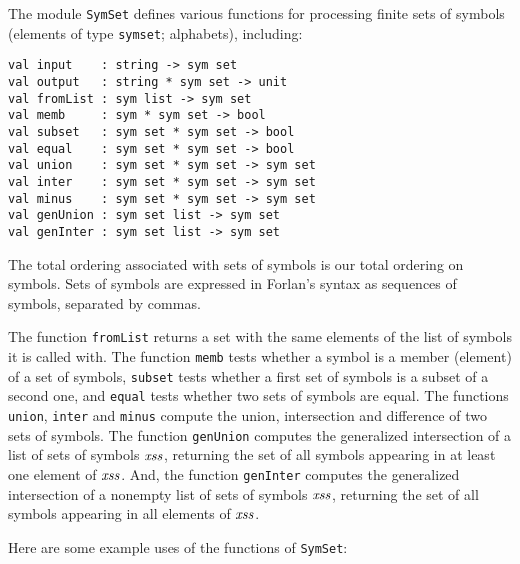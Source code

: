 The module \texttt{SymSet}
%
defines various functions for processing
finite sets of symbols (elements of type \texttt{sym\;set};
%
alphabets), including:
\begin{verbatim}
val input    : string -> sym set
val output   : string * sym set -> unit
val fromList : sym list -> sym set
val memb     : sym * sym set -> bool
val subset   : sym set * sym set -> bool
val equal    : sym set * sym set -> bool
val union    : sym set * sym set -> sym set
val inter    : sym set * sym set -> sym set
val minus    : sym set * sym set -> sym set
val genUnion : sym set list -> sym set
val genInter : sym set list -> sym set
\end{verbatim}
%
%
%
%
%
%
%
%
%
%
%
The total ordering associated with sets of symbols is our total
ordering on symbols.  Sets of symbols are expressed in Forlan's syntax
as sequences of symbols, separated by commas.

The function \texttt{fromList} returns a set with the same elements of
the list of symbols it is called with.  The function \texttt{memb}
tests whether a symbol is a member (element) of a set of symbols,
\texttt{subset} tests whether a first set of symbols is a subset of a
second one, and \texttt{equal} tests whether two sets of symbols are
equal.  The functions \texttt{union}, \texttt{inter} and
\texttt{minus} compute the union, intersection and difference of two
sets of symbols.  The function \texttt{genUnion} computes the
generalized intersection of a list of sets of symbols ${\it xss}$,
returning the set of all symbols appearing in at least one element of
${\it xss}$.  And, the function \texttt{genInter} computes the generalized
intersection of a nonempty list of sets of symbols ${\it xss}$, returning
the set of all symbols appearing in all elements of ${\it xss}$.

Here are some example uses of the functions of \texttt{SymSet}:


